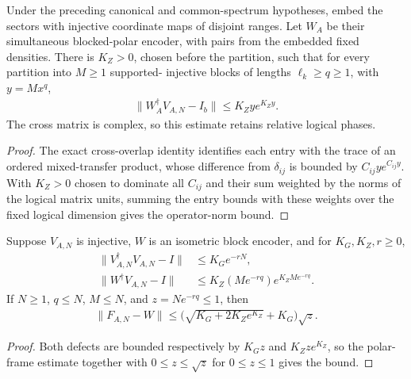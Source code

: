 \begin{lemma}
    \label{thm:ldp_sector_cross_rate}
    \leanok
    Under the preceding canonical and common-spectrum hypotheses, embed
    the sectors with injective coordinate maps of disjoint ranges. Let
    $W_A$ be their simultaneous blocked-polar encoder, with pairs from
    the embedded fixed densities. There is $K_Z>0$, chosen before the
    partition, such that for every partition into $M\ge1$ supported-
    injective blocks of lengths $\ell_k\ge q\ge1$, with $y=Mx^q$,
    \begin{align*}
        \|W_A^\dagger V_{A,N}-I_b\|\le K_Z y e^{K_Z y}.
    \end{align*}
    The cross matrix is complex, so this estimate retains relative
    logical phases.
\end{lemma}
\begin{proof}\leanok
    The exact cross-overlap identity identifies each entry with the
    trace of an ordered mixed-transfer product, whose difference from
    $\delta_{ij}$ is bounded by $C_{ij}y e^{C_{ij}y}$. With $K_Z>0$ chosen to
    dominate all $C_{ij}$ and their sum weighted by the norms of the
    logical matrix units, summing the entry bounds with these weights over the fixed logical dimension gives the operator-norm bound.
\end{proof}

\begin{lemma}
    \label{thm:ldp_sector_sqrt_rate}
    \leanok
    Suppose $V_{A,N}$ is injective, $W$ is an isometric block encoder,
    and for $K_G,K_Z,r\ge0$,
    \begin{align*}
        \|V_{A,N}^\dagger V_{A,N}-I\| & \le K_Ge^{-rN},                   \\
        \|W^\dagger V_{A,N}-I\|       & \le K_Z(Me^{-rq})e^{K_ZMe^{-rq}}.
    \end{align*}
    If $N\ge1$, $q\le N$, $M\le N$, and $z=Ne^{-rq}\le1$, then
    \begin{align*}
        \|F_{A,N}-W\|
        \le\bigl(\sqrt{K_G+2K_Ze^{K_Z}}+K_G\bigr)\sqrt z.
    \end{align*}
\end{lemma}
\begin{proof}\leanok
    Both defects are bounded respectively by $K_Gz$ and $K_Zze^{K_Z}$, so the
    polar-frame estimate together with $0\le z\le\sqrt z$ for
    $0\le z\le1$ gives the bound.
\end{proof}

